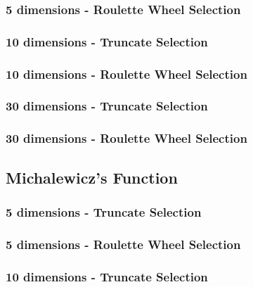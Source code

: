 \documentclass{article}
\begin{document}
\subsubsection{5 dimensions - Roulette Wheel Selection}


\subsubsection{10 dimensions - Truncate Selection}

\subsubsection{10 dimensions - Roulette Wheel Selection}


\subsubsection{30 dimensions - Truncate Selection}

\subsubsection{30 dimensions - Roulette Wheel Selection}


\newpage
\subsection{Michalewicz’s Function}

\subsubsection{5 dimensions - Truncate Selection}

\subsubsection{5 dimensions - Roulette Wheel Selection}


\subsubsection{10 dimensions - Truncate Selection}
\end{document}
